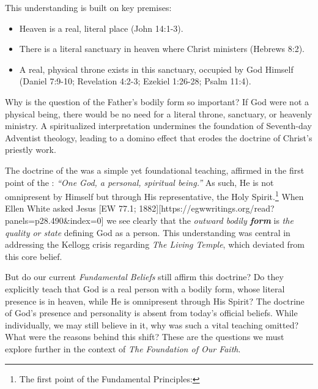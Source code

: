 This understanding is built on key premises:
\begin{itemize}
    \item Heaven is a real, literal place (John 14:1-3).
    \item There is a literal sanctuary in heaven where Christ ministers (Hebrews 8:2). 
    \item A real, physical throne exists in this sanctuary, occupied by God Himself (Daniel 7:9-10; Revelation 4:2-3; Ezekiel 1:26-28; Psalm 11:4).
\end{itemize}

Why is the question of the Father’s bodily form so important? If God were not a physical being, there would be no need for a literal throne, sanctuary, or heavenly ministry. A spiritualized interpretation undermines the foundation of Seventh-day Adventist theology, leading to a domino effect that erodes the doctrine of Christ’s priestly work.

The doctrine of the  was a simple yet foundational teaching, affirmed in the first point of the : \textit{“One God, a personal, spiritual being.”} As such, He is not omnipresent by Himself but through His representative, the Holy Spirit.\footnote{The first point of the Fundamental Principles: } When Ellen White asked Jesus [EW 77.1; 1882][https://egwwritings.org/read?panels=p28.490&index=0] we see clearly that the \textit{outward bodily \textbf{form}} is \textit{the quality or state} defining God as a person. This understanding was central in addressing the Kellogg crisis regarding \textit{The Living Temple}, which deviated from this core belief.

But do our current \textit{Fundamental Beliefs} still affirm this doctrine? Do they explicitly teach that God is a real person with a bodily form, whose literal presence is in heaven, while He is omnipresent through His Spirit? The doctrine of God’s presence and personality is absent from today’s official beliefs. While individually, we may still believe in it, why was such a vital teaching omitted? What were the reasons behind this shift? These are the questions we must explore further in the context of \textit{The Foundation of Our Faith}.

